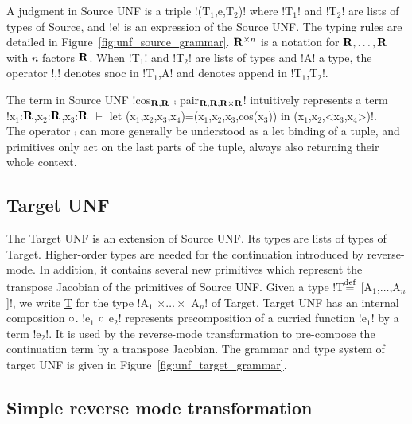 A judgment in Source UNF is a triple !(T$_1$,e,T$_2$)! where !T$_1$! and !T$_2$! are lists of types of Source, and !e! is an expression of the Source UNF.
The typing rules are detailed in Figure~\ref{fig:unf_source_grammar}.
$\mathbf{R}^{\times n}$ is a notation for $\mathbf{R},\ldots,\mathbf{R}$ with $n$ factors $\mathbf{R}$. 
When !T$_1$! and !T$_2$! are lists of types and !A! a type, the operator !,! denotes snoc in !T$_1$,A! and denotes append in !T$_1$,T$_2$!.

\begin{example}
    \label{exm:unf}
    The term in Source UNF !cos$_{\mathbf{R},\mathbf{R}}$ $\comp$ pair$_{\mathbf{R},\mathbf{R}; \mathbf{R}\times\mathbf{R}}$! 
    intuitively represents a term \\
    !x$_1$:$\mathbf{R}$,x$_2$:$\mathbf{R}$,x$_3$:$\mathbf{R}$ $\vdash$ let (x$_1$,x$_2$,x$_3$,x$_4$)=(x$_1$,x$_2$,x$_3$,cos(x$_3$)) in (x$_1$,x$_2$,<x$_3$,x$_4$>)!.\\
    The operator $\comp$ can more generally be understood as a let binding of a tuple, and primitives only act on the last parts of the tuple, always also returning their whole context.
\end{example}

\subsection{Target UNF} %
\label{sub:Target UNF}

The Target UNF is an extension of Source UNF. 
Its types are lists of types of Target. 
Higher-order types are needed for the continuation introduced by reverse-mode. 
In addition, it contains several new primitives which represent the transpose Jacobian of the primitives of Source UNF.
Given a type !T$\stackrel {\mathrm{def}}=$ [A$_1$,$\ldots$,A$_n$]!, we write \underline{T} for the type !A$_1$ $\times\ldots\times$ A$_n$! of Target. 
Target UNF has an internal composition $\circ$. 
!e$_{1}$ $\circ$ e$_{2}$! represents precomposition of a curried function !e$_{1}$! by a term !e$_{2}$!.
It is used by the reverse-mode transformation to pre-compose the continuation term by a transpose Jacobian.
The grammar and type system of target UNF is given in Figure~\ref{fig:unf_target_grammar}.



\subsection{Simple reverse mode transformation} %
\label{sub:Simple reverse mode transformation}

